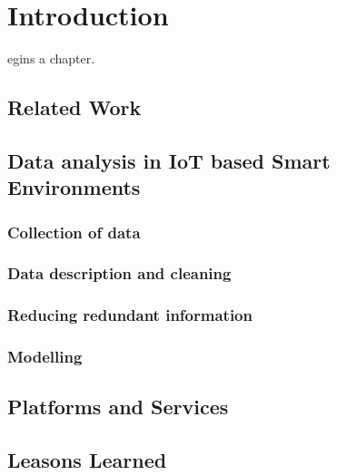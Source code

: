 %
%
\let\textcircled=\pgftextcircled
\chapter{Introduction}
\label{chap:intro}

egins a chapter. 

\section{Related Work}
\label{sec:rw}


\section{Data analysis in IoT based Smart Environments}
\label{sec:data}

\subsection{Collection of data}

\subsection{Data description and cleaning}

\subsection{Reducing redundant information}

\subsection{Modelling}


\section{Platforms and Services}
\label{sec:platSer}


\section{Leasons Learned}
\label{sec:ll}